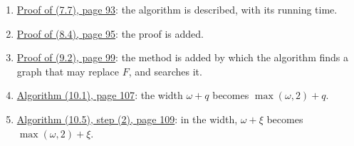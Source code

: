 \begin{enumerate}
once, from $H_0$ to $H_k$, instead of Claim (1) at each step.
\item {}\hyperref[fix:7.7-proof-added]{Proof of (7.7), page 93}: the algorithm is described,
with its running time.
\item {}\hyperref[fix:8.4-proof-added]{Proof of (8.4), page 95}: the proof is added.
\item {}\hyperref[fix:9.2-F-proof-added]{Proof of (9.2), page 99}: the method is added by which
the algorithm finds a graph that may replace $F$, and searches it.
\item {}\hyperref[fix:10.1]{Algorithm (10.1), page 107}: the width $\omega + q$ becomes
$\max(\omega, 2) + q$.
\item {}\hyperref[fix:10.5-step2]{Algorithm (10.5), step (2), page 109}: in the width,
$\omega + \xi$ becomes $\max(\omega, 2) + \xi$.
\end{enumerate}
